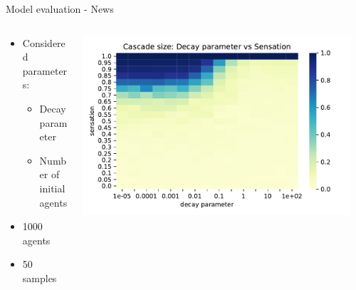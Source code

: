 \documentclass{beamer}
\begin{document}
\begin{frame}{Model evaluation - News}
    \begin{columns}
        \begin{column}{0.5\textwidth}
            \begin{itemize}
                \item Considered parameters:
                    \begin{itemize}
                        \item Decay parameter
                        \item Number of initial agents
                    \end{itemize}
                \item 1000 agents
                \item 50 samples
            \end{itemize}
        \end{column}
        \begin{column}{0.5\textwidth}
            \centering
            \includegraphics[width=0.95\textwidth]{images/decay_sensation.pdf}
        \end{column}
    \end{columns}
\end{frame}
\end{document}
